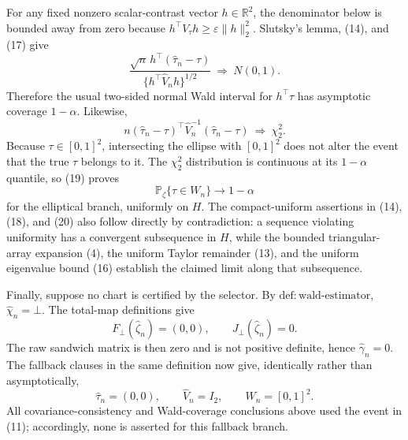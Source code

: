 For any fixed nonzero scalar-contrast vector \(h\in\mathbb R^2\), the denominator below is bounded away from zero because
\(h^\top V_{\tau}h\ge\varepsilon\|h\|_2^2\).  Slutsky's lemma, (14), and (17) give
\[
\frac{\sqrt n\,h^\top(\widehat\tau_n-\tau)}
{\{h^\top\widehat V_nh\}^{1/2}}
\ \Rightarrow\ N(0,1).
\tag{18}
\]
Therefore the usual two-sided normal Wald interval for \(h^\top\tau\) has asymptotic coverage \(1-\alpha\).  Likewise,
\[
n(\widehat\tau_n-\tau)^\top
\widehat V_n^{-1}
(\widehat\tau_n-\tau)
\ \Rightarrow\ \chi^2_2.
\tag{19}
\]
Because \(\tau\in[0,1]^2\), intersecting the ellipse with \([0,1]^2\) does not alter the event that the true \(\tau\) belongs to it.  The \(\chi^2_2\) distribution is continuous at its \(1-\alpha\) quantile, so (19) proves
\[
\mathbb P_{\zeta}\{\tau\in W_n\}\longrightarrow1-\alpha
\tag{20}
\]
for the elliptical branch, uniformly on \(H\).  The compact-uniform assertions in (14), (18), and (20) also follow directly by contradiction: a sequence violating uniformity has a convergent subsequence in \(H\), while the bounded triangular-array expansion (4), the uniform Taylor remainder (13), and the uniform eigenvalue bound (16) establish the claimed limit along that subsequence.

Finally, suppose no chart is certified by the selector.  By \(\mathrm{def:wald\text{-}estimator}\), \(\widehat\chi_n=\bot\).  The total-map definitions give
\[
F_{\bot}(\widehat\zeta_n)=(0,0),
\qquad
J_{\bot}(\widehat\zeta_n)=0.
\]
The raw sandwich matrix is then zero and is not positive definite, hence
\(\widehat\gamma_n=0\).  The fallback clauses in the same definition now give, identically rather than asymptotically,
\[
\widehat\tau_n=(0,0),\qquad
\widehat V_n=I_2,\qquad
W_n=[0,1]^2.
\]
All covariance-consistency and Wald-coverage conclusions above used the event in (11); accordingly, none is asserted for this fallback branch.
